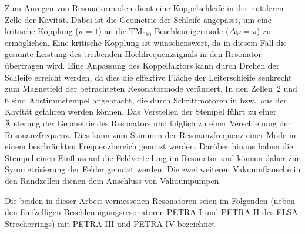 Zum Anregen von Resonatormoden dient eine Koppelschleife \cite{desy_schleife} in der mittleren Zelle der Kavität.
Dabei ist die Geometrie der Schleife angepasst, um eine kritische Kopplung ($\kappa = 1$) an die $\mathrm{TM}_{010}$-Beschleuniger\-mode ($\Delta \varphi = \pi$) zu ermöglichen.
Eine kritische Kopplung ist wünschenswert, da in diesem Fall die gesamte Leistung des treibenden Hochfrequenzsignals in den Resonator übertragen wird.
Eine Anpassung des Koppelfaktors kann durch Drehen der Schleife erreicht werden, da dies die effektive Fläche der Leiterschleife senkrecht zum Magnetfeld der betrachteten Resonatormode verändert.
In den Zellen~2 und 6 sind Abstimmstempel \cite{desy_stempel} angebracht, die durch Schrittmotoren in bzw.\ aus der Kavität gefahren werden können.
Das Verstellen der Stempel führt zu einer Änderung der Geometrie des Resonators und folglich zu einer Verschiebung der Resonanzfrequenz.
Dies kann zum Stimmen der Resonanzfrequenz einer Mode in einem beschränkten Frequenzbereich genutzt werden.
Darüber hinaus haben die Stempel einen Einfluss auf die Feldverteilung im Resonator und können daher zur Symmetrisierung der Felder genutzt werden.
Die zwei weiteren Vakuumflansche in den Randzellen dienen dem Anschluss von Vakuumpumpen.

Die beiden in dieser Arbeit vermessenen Resonatoren seien im Folgenden (neben den fünfzelligen Beschleunigungsresonatoren PETRA-I und PETRA-II des ELSA Strecherrings) mit PETRA-III und PETRA-IV bezeichnet.


